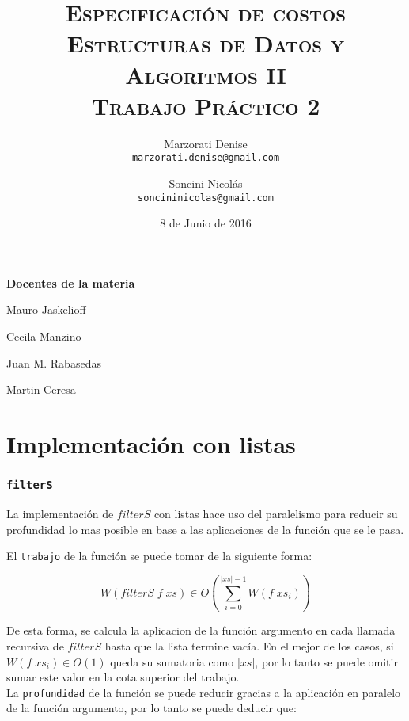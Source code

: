 \documentclass[a4paper,10pt]{article}
\author{
    Marzorati Denise \\
    \texttt{marzorati.denise@gmail.com}
    \and Soncini Nicolás \\
    \texttt{soncininicolas@gmail.com}
}
\date{
    8 de Junio de 2016
}
\title{
    \Huge \textsc{Especificación de costos} \\
    \large \textsc{Estructuras de Datos y Algoritmos II} \\
    \textsc{Trabajo Práctico 2}
}
\begin{document}
\maketitle

\thispagestyle{empty}

\begin{center}
\large \bf Docentes de la materia
\end{center}

\begin{center}
Mauro Jaskelioff

Cecila Manzino

Juan M. Rabasedas

Martin Ceresa
\end{center}

\newpage{}


\part*{Implementación con listas}


\section*{\texttt{filterS}}

    La implementación de $filterS$ con listas hace uso del paralelismo para
reducir su profundidad lo mas posible en base a las aplicaciones de la función 
que se le pasa.

    El \texttt{trabajo} de la función se puede tomar de la siguiente forma:

\begin{equation*}
    W \left(filterS\; f \;xs\right) \in
    O \left( \sum_{i=0}^{\vert xs \vert -1} W \left( f\; xs_i \right) \right)
\end{equation*}

De esta forma, se calcula la aplicacion de la función argumento en cada
llamada recursiva de $filterS$ hasta que la lista termine vacía.
En el mejor de los casos, si $W \left( f\; xs_i \right) \in O \left( 1 \right)$ queda
su sumatoria como $\vert xs \vert$, por lo tanto se puede omitir sumar este valor
en la cota superior del trabajo.
\bigskip
\\

La \texttt{profundidad} de la función se puede reducir gracias a la aplicación
en paralelo de la función argumento, por lo tanto se puede deducir que:
\end{document}
